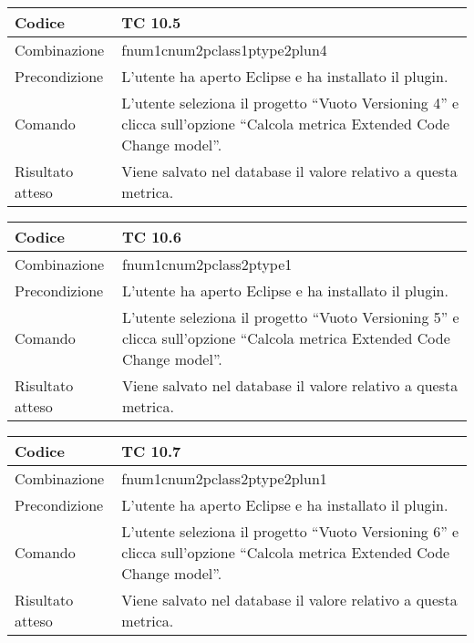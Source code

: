 \begin{table}[ht]
\begin{tabular}{|p{3cm}|p{9cm}|}
\hline
\cellcolor{lightgray}Codice				& TC 10.5								\\
\hline
\cellcolor{lightgray}Combinazione		& fnum1cnum2pclass1ptype2plun4									\\
\hline
\cellcolor{lightgray}Precondizione		& L'utente ha aperto Eclipse e ha installato il plugin.		\\
\hline
\cellcolor{lightgray}Comando			& L'utente seleziona il progetto ``Vuoto Versioning 4''  e clicca sull'opzione ``Calcola metrica Extended Code Change model''.	\\
\hline
\cellcolor{lightgray}Risultato atteso	& Viene salvato nel database il valore relativo a questa metrica.\\
\hline
\end{tabular}
\end{table}


\begin{table}[ht]
\begin{tabular}{|p{3cm}|p{9cm}|}
\hline
\cellcolor{lightgray}Codice				& TC 10.6								\\
\hline
\cellcolor{lightgray}Combinazione		& fnum1cnum2pclass2ptype1									\\
\hline
\cellcolor{lightgray}Precondizione		& L'utente ha aperto Eclipse e ha installato il plugin.		\\
\hline
\cellcolor{lightgray}Comando			& L'utente seleziona il progetto ``Vuoto Versioning 5''  e clicca sull'opzione ``Calcola metrica Extended Code Change model''.	\\
\hline
\cellcolor{lightgray}Risultato atteso	& Viene salvato nel database il valore relativo a questa metrica.\\
\hline
\end{tabular}
\end{table}

\begin{table}[ht]
\begin{tabular}{|p{3cm}|p{9cm}|}
\hline
\cellcolor{lightgray}Codice				& TC 10.7								\\
\hline
\cellcolor{lightgray}Combinazione		& fnum1cnum2pclass2ptype2plun1									\\
\hline
\cellcolor{lightgray}Precondizione		& L'utente ha aperto Eclipse e ha installato il plugin.		\\
\hline
\cellcolor{lightgray}Comando			& L'utente seleziona il progetto ``Vuoto Versioning 6''  e clicca sull'opzione ``Calcola metrica Extended Code Change model''.	\\
\hline
\cellcolor{lightgray}Risultato atteso	& Viene salvato nel database il valore relativo a questa metrica.\\
\hline
\end{tabular}
\end{table}

